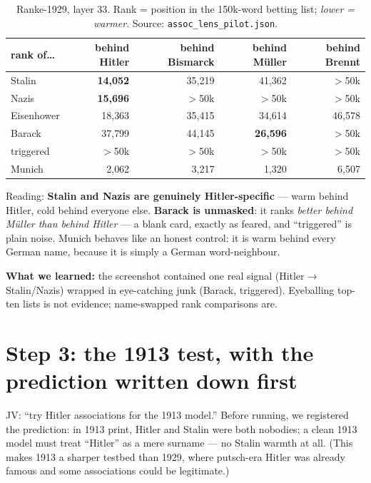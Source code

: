 \documentclass[11pt]{article}
\newcommand{\finding}[1]{\medskip\noindent\textbf{What we learned:} #1\medskip}
\begin{document}
\begin{table}[h]\centering\small
\begin{tabular}{lrrrr}
\toprule
rank of\ldots & behind Hitler & behind Bismarck & behind M\"uller & behind Brennt \\
\midrule
Stalin     & \textbf{14{,}052} & 35{,}219 & 41{,}362 & $>$50k \\
Nazis      & \textbf{15{,}696} & $>$50k   & $>$50k   & $>$50k \\
Eisenhower & 18{,}363          & 35{,}415 & 34{,}614 & 46{,}578 \\
Barack     & 37{,}799          & 44{,}145 & \textbf{26{,}596} & $>$50k \\
triggered  & $>$50k            & $>$50k   & $>$50k   & $>$50k \\
Munich     & 2{,}062           & 3{,}217  & 1{,}320  & 6{,}507 \\
\bottomrule
\end{tabular}
\caption{Ranke-1929, layer 33. Rank = position in the 150k-word betting list; \emph{lower = warmer}.
Source: \texttt{assoc\_lens\_pilot.json}.}
\end{table}

Reading: \textbf{Stalin and Nazis are genuinely Hitler-specific} --- warm behind Hitler, cold behind
everyone else. \textbf{Barack is unmasked}: it ranks \emph{better behind M\"uller than behind Hitler}
--- a blank card, exactly as feared, and ``triggered'' is plain noise. Munich behaves like an honest
control: it is warm behind every German name, because it is simply a German word-neighbour.

\finding{the screenshot contained one real signal (Hitler$\to$Stalin/Nazis) wrapped in eye-catching
junk (Barack, triggered). Eyeballing top-ten lists is not evidence; name-swapped rank comparisons are.}

\section{Step 3: the 1913 test, with the prediction written down first}

JV: ``try Hitler associations for the 1913 model.'' Before running, we registered the prediction: in
1913 print, Hitler and Stalin were both nobodies; a clean 1913 model must treat ``Hitler'' as a mere
surname --- no Stalin warmth at all. (This makes 1913 a sharper testbed than 1929, where putsch-era
Hitler was already famous and some associations could be legitimate.)
\end{document}

